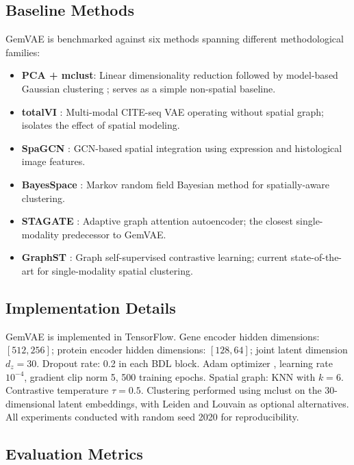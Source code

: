 \documentclass[conference]{IEEEtran}
\begin{document}
\subsection{Baseline Methods}

GemVAE is benchmarked against six methods spanning different methodological families:

\begin{itemize}
    \item \textbf{PCA + mclust}: Linear dimensionality reduction followed by model-based Gaussian clustering \cite{b16}; serves as a simple non-spatial baseline.
    \item \textbf{totalVI} \cite{b4}: Multi-modal CITE-seq VAE operating without spatial graph; isolates the effect of spatial modeling.
    \item \textbf{SpaGCN} \cite{b6}: GCN-based spatial integration using expression and histological image features.
    \item \textbf{BayesSpace} \cite{b7}: Markov random field Bayesian method for spatially-aware clustering.
    \item \textbf{STAGATE} \cite{b2}: Adaptive graph attention autoencoder; the closest single-modality predecessor to GemVAE.
    \item \textbf{GraphST} \cite{b5}: Graph self-supervised contrastive learning; current state-of-the-art for single-modality spatial clustering.
\end{itemize}

\subsection{Implementation Details}

GemVAE is implemented in TensorFlow. Gene encoder hidden dimensions: $[512, 256]$; protein encoder hidden dimensions: $[128, 64]$; joint latent dimension $d_z = 30$. Dropout rate: 0.2 in each BDL block. Adam optimizer \cite{b10}, learning rate $10^{-4}$, gradient clip norm 5, 500 training epochs. Spatial graph: KNN with $k = 6$. Contrastive temperature $\tau = 0.5$. Clustering performed using mclust \cite{b16} on the 30-dimensional latent embeddings, with Leiden and Louvain as optional alternatives. All experiments conducted with random seed 2020 for reproducibility.

\subsection{Evaluation Metrics}
\end{document}
